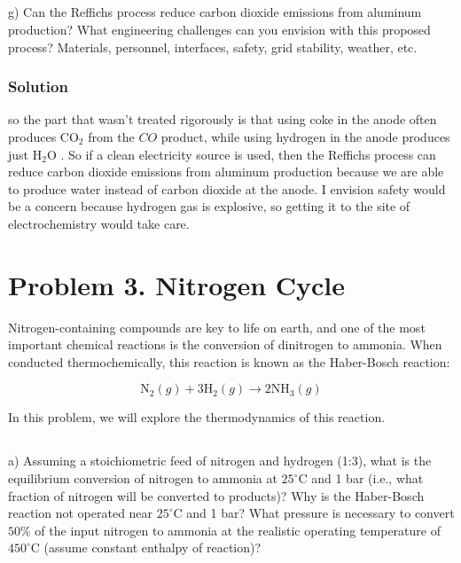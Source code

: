 \documentclass[12pt]{article}
\begin{document}
\subsection{}




g) Can the Reffichs process reduce carbon dioxide emissions from aluminum production? What engineering challenges can you envision with this proposed process? Materials, personnel, interfaces, safety, grid stability, weather, etc.
\subsubsection{Solution}
so the part that wasn't treated rigorously is that using coke in the anode often produces $\mathrm{CO}_{2}$ from the $CO$ product, while using hydrogen in the anode produces just $\mathrm{H}_{2} \mathrm{O}$ . So if a clean electricity source is used, then the Reffichs process can reduce carbon dioxide emissions from aluminum production because we are able to produce water instead of carbon dioxide at the anode. I envision safety would be a concern because hydrogen gas is explosive, so getting it to the site of electrochemistry would take care.

\section{Problem 3. Nitrogen Cycle}
Nitrogen-containing compounds are key to life on earth, and one of the most important chemical reactions is the conversion of dinitrogen to ammonia. When conducted thermochemically, this reaction is known as the Haber-Bosch reaction:

$$
\mathrm{N}_{2}(g)+3 \mathrm{H}_{2}(g) \rightarrow 2 \mathrm{NH}_{3}(g)
$$

In this problem, we will explore the thermodynamics of this reaction.\\
\subsection{}
a) Assuming a stoichiometric feed of nitrogen and hydrogen (1:3), what is the equilibrium conversion of nitrogen to ammonia at $25^{\circ} \mathrm{C}$ and 1 bar (i.e., what fraction of nitrogen will be converted to products)? Why is the Haber-Bosch reaction not operated near $25^{\circ} \mathrm{C}$ and 1 bar? What pressure is necessary to convert $50 \%$ of the input nitrogen to ammonia at the realistic operating temperature of $450^{\circ} \mathrm{C}$ (assume constant enthalpy of reaction)?
\end{document}
